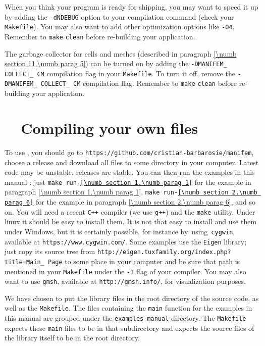 When you think your program is ready for shipping, you may want to speed it up
by adding the {\small\tt -dNDEBUG} option to your compilation command
(check your {\small\tt Makefile}).
You may also want to add other optimization options like {\small\tt -O4}.
Remember to {\small\tt make} {\small\tt clean} before re-building your application.

The garbage collector for cells and meshes (described in paragraph
\ref{\numb section 11.\numb parag 5}) can be turned on by adding the
{\small\tt -DMANIFEM\_\,COLLECT\_\,CM} compilation flag in your {\small\tt Makefile}.
To turn it off, remove the {\small\tt -DMANIFEM\_\,COLLECT\_\,CM} compilation flag.
Remember to {\small\tt make} {\small\tt clean} before re-building your application.


\section{~~Compiling your own files}\label{\numb section 11.\numb parag 16}

To use \maniFEM, you should go to {\small\tt https://github.com/cristian-barbarosie/manifem},
choose a release and download all files to some directory in your computer.
Latest code may be unstable, releases are stable.
You can then run the examples in this manual :
just {\small\tt make run-\ref{\numb section 1.\numb parag 1}}
for the example in paragraph \ref{\numb section 1.\numb parag 1},
{\small\tt make run-\ref{\numb section 2.\numb parag 6}}
for the example in paragraph \ref{\numb section 2.\numb parag 6}, and so on.
You will need a recent {\tt C++} compiler (we use {\tt g++}) and the {\tt make} utility.
Under linux it should be easy to install them.
It is not that easy to install and use them under Windows, but it is certainly possible,
for instance \hbox{by using {\small\tt cygwin}},
available at {\small\tt https://www.cygwin.com/}.
Some examples use the {\small\tt Eigen} library; just copy its source tree
from {\small\tt http://eigen.tuxfamily.org/index.php? title=Main\_\,Page}
to some place in your computer and be sure that
path is mentioned in your {\small\tt Makefile}
under the {\small\tt -I} flag of your compiler.
You may also want to use {\tt gmsh}, available at {\small\tt http://gmsh.info/},
for visualization purposes.

We have chosen to put the library files in the root directory of the source code,
as well as the {\small\tt Makefile}.
The files containing the {\small\tt main} function for the examples in this manual are
grouped under the {\small\tt examples-manual} directory.
The {\small\tt Makefile} expects these {\small\tt main} files to be in that subdirectory
and expects the source files of the library itself to be in the root directory.

